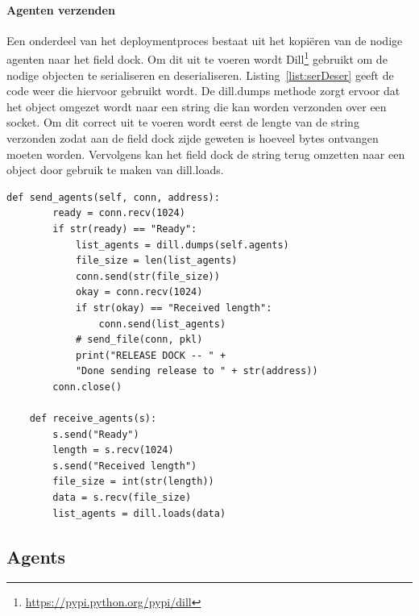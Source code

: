 \paragraph{Agenten verzenden}
Een onderdeel van het deploymentproces bestaat uit het kopiëren van de nodige agenten naar het field dock.
Om dit uit te voeren wordt Dill\footnote{\url{https://pypi.python.org/pypi/dill}} gebruikt om de nodige objecten te serialiseren en deserialiseren.
Listing~\vref{list:serDeser} geeft de code weer die hiervoor gebruikt wordt.
De dill.dumps methode zorgt ervoor dat het object omgezet wordt naar een string die kan worden verzonden over een socket.
Om dit correct uit te voeren wordt eerst de lengte van de string verzonden zodat aan de field dock zijde geweten is hoeveel bytes ontvangen moeten worden. 
Vervolgens kan het field dock de string terug omzetten naar een object door gebruik te maken van dill.loads.

\begin{minipage}{\linewidth}
\begin{center}
\begin{lstlisting}[caption={Verzenden en ontvangen van agenten},label={list:serDeser}]
    def send_agents(self, conn, address):
        ready = conn.recv(1024)
        if str(ready) == "Ready":
            list_agents = dill.dumps(self.agents)
            file_size = len(list_agents)
            conn.send(str(file_size))
            okay = conn.recv(1024)
            if str(okay) == "Received length":
                conn.send(list_agents)
            # send_file(conn, pkl)
            print("RELEASE DOCK -- " +
            "Done sending release to " + str(address))
        conn.close()
        
    def receive_agents(s):        
        s.send("Ready")
        length = s.recv(1024)
        s.send("Received length")
        file_size = int(str(length))
        data = s.recv(file_size)
        list_agents = dill.loads(data)
\end{lstlisting}
\end{center}
\end{minipage}


\subsection{Agents}
